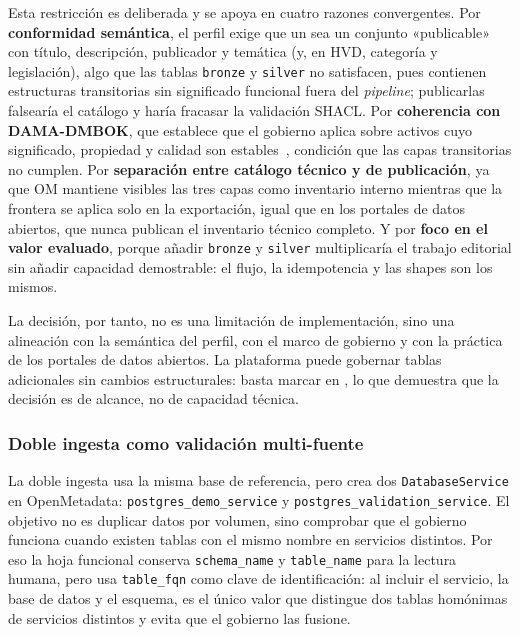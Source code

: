 Esta restricción es deliberada y se apoya en cuatro razones convergentes. Por \textbf{conformidad semántica}, el perfil exige que un  sea un conjunto «publicable» con título, descripción, publicador y temática (y, en HVD, categoría y legislación), algo que las tablas \texttt{bronze} y \texttt{silver} no satisfacen, pues contienen estructuras transitorias sin significado funcional fuera del \emph{pipeline}; publicarlas falsearía el catálogo y haría fracasar la validación \ac{SHACL}. Por \textbf{coherencia con DAMA-DMBOK}, que establece que el gobierno aplica sobre activos cuyo significado, propiedad y calidad son estables~\cite{damaDmbok}, condición que las capas transitorias no cumplen. Por \textbf{separación entre catálogo técnico y de publicación}, ya que \ac{OM} mantiene visibles las tres capas como inventario interno mientras que la frontera se aplica solo en la exportación, igual que en los portales de datos abiertos, que nunca publican el inventario técnico completo. Y por \textbf{foco en el valor evaluado}, porque añadir \texttt{bronze} y \texttt{silver} multiplicaría el trabajo editorial sin añadir capacidad demostrable: el flujo, la idempotencia y las shapes son los mismos.

La decisión, por tanto, no es una limitación de implementación, sino una alineación con la semántica del perfil, con el marco de gobierno y con la práctica de los portales de datos abiertos. La plataforma puede gobernar tablas adicionales sin cambios estructurales: basta marcar  en , lo que demuestra que la decisión es de alcance, no de capacidad técnica.

\subsubsection{Doble ingesta como validación multi-fuente}

La doble ingesta usa la misma base de referencia, pero crea dos \texttt{DatabaseService} en OpenMetadata: \texttt{postgres\_demo\_service} y \texttt{postgres\_validation\_service}. El objetivo no es duplicar datos por volumen, sino comprobar que el gobierno funciona cuando existen tablas con el mismo nombre en servicios distintos. Por eso la hoja funcional conserva \texttt{schema\_name} y \texttt{table\_name} para la lectura humana, pero usa \texttt{table\_fqn} como clave de identificación: al incluir el servicio, la base de datos y el esquema, es el único valor que distingue dos tablas homónimas de servicios distintos y evita que el gobierno las fusione.

